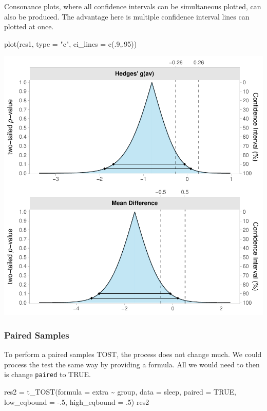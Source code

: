 \documentclass[]{interact}
\theoremstyle{plain}%
\theoremstyle{definition}
\theoremstyle{remark}
\newenvironment{Shaded}{\begin{snugshade}}{\end{snugshade}}
\newcommand{\AttributeTok}[1]{\textcolor[rgb]{0.77,0.63,0.00}{#1}}
\newcommand{\ConstantTok}[1]{\textcolor[rgb]{0.00,0.00,0.00}{#1}}
\newcommand{\DecValTok}[1]{\textcolor[rgb]{0.00,0.00,0.81}{#1}}
\newcommand{\FunctionTok}[1]{\textcolor[rgb]{0.00,0.00,0.00}{#1}}
\newcommand{\NormalTok}[1]{#1}
\newcommand{\OtherTok}[1]{\textcolor[rgb]{0.56,0.35,0.01}{#1}}
\newcommand{\SpecialCharTok}[1]{\textcolor[rgb]{0.00,0.00,0.00}{#1}}
\newcommand{\StringTok}[1]{\textcolor[rgb]{0.31,0.60,0.02}{#1}}
\begin{document}
Consonance plots, where all confidence intervals can be simultaneous
plotted, can also be produced. The advantage here is multiple confidence
interval lines can plotted at once.

\begin{Shaded}
\begin{Highlighting}[]
\FunctionTok{plot}\NormalTok{(res1, }\AttributeTok{type =} \StringTok{"c"}\NormalTok{,}
     \AttributeTok{ci\_lines =}  \FunctionTok{c}\NormalTok{(.}\DecValTok{9}\NormalTok{,.}\DecValTok{95}\NormalTok{))}
\end{Highlighting}
\end{Shaded}

\includegraphics{Avocado_Update_files/figure-latex/unnamed-chunk-7-1.pdf}

\hypertarget{paired-samples}{%
\subsubsection{Paired Samples}\label{paired-samples}}

To perform a paired samples TOST, the process does not change much. We
could process the test the same way by providing a formula. All we would
need to then is change \texttt{paired} to TRUE.

\begin{Shaded}
\begin{Highlighting}[]
\NormalTok{res2 }\OtherTok{=} \FunctionTok{t\_TOST}\NormalTok{(}\AttributeTok{formula =}\NormalTok{ extra }\SpecialCharTok{\textasciitilde{}}\NormalTok{ group,}
              \AttributeTok{data =}\NormalTok{ sleep,}
              \AttributeTok{paired =} \ConstantTok{TRUE}\NormalTok{,}
              \AttributeTok{low\_eqbound =} \SpecialCharTok{{-}}\NormalTok{.}\DecValTok{5}\NormalTok{,}
              \AttributeTok{high\_eqbound =}\NormalTok{ .}\DecValTok{5}\NormalTok{)}
\NormalTok{res2}
\end{Highlighting}
\end{Shaded}
\end{document}
